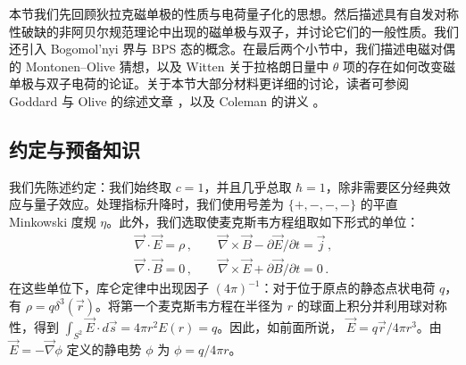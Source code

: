 本节我们先回顾狄拉克磁单极的性质与电荷量子化的思想。然后描述具有自发对称性破缺的非阿贝尔规范理论中出现的磁单极与双子，并讨论它们的一般性质。我们还引入 Bogomol'nyi 界与 BPS 态的概念。在最后两个小节中，我们描述电磁对偶的 Montonen–Olive 猜想，以及 Witten 关于拉格朗日量中 $\theta$ 项的存在如何改变磁单极与双子电荷的论证。关于本节大部分材料更详细的讨论，读者可参阅 Goddard 与 Olive 的综述文章 \cite{GO}，以及 Coleman 的讲义 \cite{coleman1,coleman2}。

\subsection{约定与预备知识}

我们先陈述约定：我们始终取 $c=1$，并且几乎总取 $\hbar=1$，除非需要区分经典效应与量子效应。处理指标升降时，我们使用号差为 $\{ +,-,-,-\}$ 的平直 Minkowski 度规 $\eta$。此外，我们选取使麦克斯韦方程组取如下形式的单位：
\begin{equation}
\begin{array}{l}
\vec{\nabla}\cdot\vec{E}=\rho\,,\qquad\vec{\nabla}\times\vec{B}-
\partial \vec{E}/\partial t =\vec{j}\,,\\
\vec{\nabla}\cdot\vec{B}=0\,,\qquad \vec{\nabla}\times\vec{E} +
\partial\vec{B}/\partial t = 0\,.
\label{I}
\end{array}
\end{equation}
在这些单位下，库仑定律中出现因子 $(4 \pi)^{-1}$：对于位于原点的静态点状电荷 $q$，有 $\rho = q 
\delta^{3}(\vec{r})$。将第一个麦克斯韦方程在半径为 $r$ 的球面上积分并利用球对称性，得到
$\int_{S^2} \vec{E} \cdot d \vec{s}=4\pi r^2 E(r)=q$。因此，如前面所说，
$\vec{E}=q\vec{r}/4\pi r^{3}$。由 $\vec{E}=-\vec{\nabla}\phi$ 定义的静电势 $\phi$ 为
$\phi = q / 4 \pi r$。



